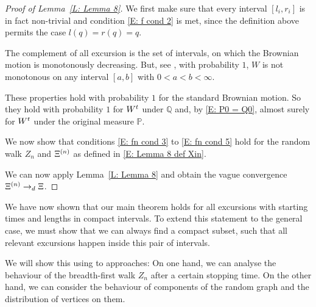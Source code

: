\begin{proof}[Proof of Lemma~\ref{L: Lemma 8}]
	We first make sure that every interval $[l_i, r_i]$ is in fact non-trivial and condition \eqref{E: f cond 2} is met,
	since the definition above permits the case $l(q) = r(q) = q$.
	
	The complement of all excursion is the set of intervals,
	on which the Brownian motion is monotonously decreasing.
	But, see \cite[Theorem 1.22]{Peres2008}, with probability $1$,
	$W$ is not monotonous on any interval $[a,b]$ with $0 < a < b < \infty$.
	
	These properties hold with probability $1$ for the standard Brownian motion.
	So they hold with probability $1$ for $W^t$ under $\mathbb{Q}$
	and, by \eqref{E: P0 = Q0}, 
	almost surely for $W^t$ under the original measure $\mathbb{P}$.
	
	
	We now show that conditions 
	\eqref{E: fn cond 3} to \eqref{E: fn cond 5}
	hold for the random walk $Z_n$ and $\Xi^{(n)}$
	as defined in \eqref{E: Lemma 8 def Xin}.
	


	We can now apply Lemma~\ref{L: Lemma 8} and obtain the vague convergence
	$ \Xi^{(n)} \rightarrow_d \Xi $.
\end{proof}


We have now shown that our main theorem holds for all excursions
with starting times and lengths in compact intervals.
To extend this statement to the general case,
we must show that we can always find a compact subset,
such that all relevant excursions happen inside this pair of intervals.

We will show this using to approaches:
On one hand, we can analyse the behaviour of the breadth-first walk $Z_n$
after a certain stopping time.
On the other hand, 
we can consider the behaviour of components of the random graph
and the distribution of vertices on them.

